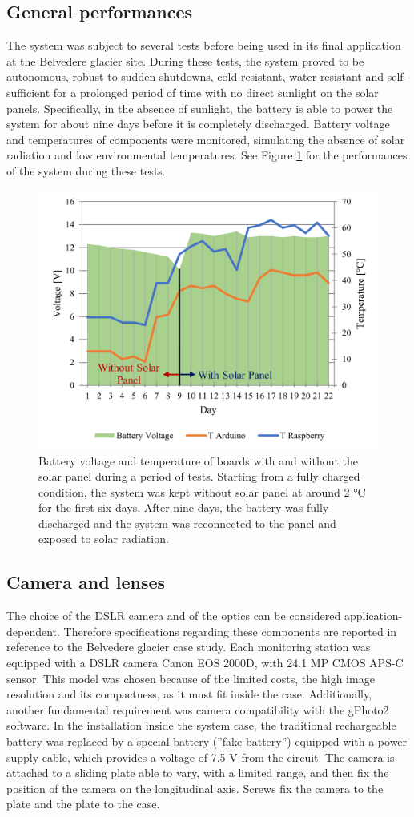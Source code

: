 \subsection{General performances}\label{General_performances}
The system was subject to several tests before being used in its final application at the
Belvedere glacier site. During these tests, the system proved to be autonomous, robust to
sudden shutdowns, cold-resistant, water-resistant and self-sufficient for a prolonged
period of time with no direct sunlight on the solar panels. Specifically, in the absence
of sunlight, the battery is able to power the system for about nine days before it is
completely discharged. Battery voltage and temperatures of components were monitored,
simulating the absence of solar radiation and low environmental temperatures. See Figure
\ref{fig:4:nominal_performance} for the performances of the system during these tests.
\begin{figure}[h!]
  \centering
  \includegraphics[width=.5\textwidth]{nominal.png}
  \caption{Battery voltage and temperature of boards with and without the solar panel
    during a period of tests. Starting from a fully charged condition, the system was
    kept without solar panel at around 2 °C for the first six days. After nine days, the
    battery was fully discharged and the system was reconnected to the panel and exposed
    to solar radiation.}
  \label{fig:4:nominal_performance}
\end{figure}

\subsection{Camera and lenses}\label{camera_lenses}
The choice of the DSLR camera and of the optics can be considered application-dependent.
Therefore specifications regarding these components are reported in reference to the
Belvedere glacier case study. Each monitoring station was equipped with a DSLR camera
Canon EOS 2000D, with 24.1 MP CMOS \mbox{APS-C} sensor. This model was chosen because of
the limited costs, the high image resolution and its compactness, as it must fit inside
the case. Additionally, another fundamental requirement was camera compatibility with the
gPhoto2 software. In the installation inside the system case, the traditional
rechargeable battery was replaced by a special battery (”fake battery”) equipped with a
power supply cable, which provides a voltage of 7.5 V from the circuit. The camera is
attached to a sliding plate able to vary, with a limited range, and then fix the position
of the camera on the longitudinal axis. Screws fix the camera to the plate and the plate
to the case.

